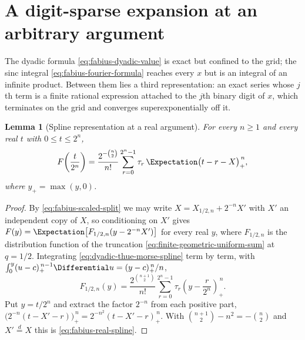 \documentclass[11pt,a4paper,oneside,openany]{book}
\newtheorem{lemma}[lemma]{Lemma}
\theoremstyle{definition}
\theoremstyle{remark}
\begin{document}

\section{A digit-sparse expansion at an arbitrary argument}

The dyadic formula \eqref{eq:fabius-dyadic-value} is exact but confined to the
grid; the sinc integral \eqref{eq:fabius-fourier-formula} reaches every $x$ but
is an integral of an infinite product.  Between them lies a third
representation: an exact series whose $j$th term is a finite rational expression
attached to the $j$th binary digit of $x$, which terminates on the grid and
converges superexponentially off it.

\begin{lemma}[Spline representation at a real argument]\label{lem:fabius-real-spline}
For every $n\ge1$ and every real $t$ with $0\le t\le2^n$,
\begin{equation}\label{eq:fabius-real-spline}
 F\!\left(\frac t{2^n}\right)
 =\frac{2^{-\binom n2}}{n!}
  \sum_{r=0}^{2^n-1}\tau_r\,\Expectation\bigl(t-r-X\bigr)_+^{\,n},
\end{equation}
where $y_+=\max(y,0)$.
\end{lemma}

\begin{proof}
By \eqref{eq:fabius-scaled-split} we may write $X=X_{1/2,n}+2^{-n}X'$ with $X'$
an independent copy of $X$, so conditioning on $X'$ gives
$F(y)=\Expectation\bigl[F_{1/2,n}(y-2^{-n}X')\bigr]$ for every real $y$, where
$F_{1/2,n}$ is the distribution function of the truncation
\eqref{eq:finite-geometric-uniform-sum} at $q=1/2$.  Integrating
\eqref{eq:dyadic-thue-morse-spline} term by term, with
$\int_0^{y}(u-c)_+^{\,n-1}\Differential u=(y-c)_+^{\,n}/n$,
\[
 F_{1/2,n}(y)
 =\frac{2^{\binom{n+1}{2}}}{n!}\sum_{r=0}^{2^n-1}\tau_r
  \left(y-\frac r{2^n}\right)_+^{\,n}.
\]
Put $y=t/2^n$ and extract the factor $2^{-n}$ from each positive part,
$\bigl(2^{-n}(t-X'-r)\bigr)_+^{\,n}=2^{-n^2}(t-X'-r)_+^{\,n}$.  With
$\binom{n+1}{2}-n^2=-\binom n2$ and $X'\overset d=X$ this is
\eqref{eq:fabius-real-spline}.
\end{proof}
\end{document}
